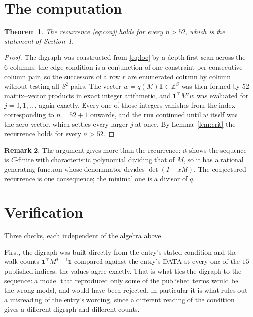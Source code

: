 \documentclass[11pt,a4paper]{article}
\theoremstyle{plain}
\newtheorem{theorem}{Theorem}
\theoremstyle{definition}
\newtheorem{remark}[theorem]{Remark}
\begin{document}
\section{The computation}

\begin{theorem}
The recurrence \eqref{eq:conj} holds for every $n>52$, which is the statement of
Section~1.
\end{theorem}

\begin{proof}
The digraph was constructed from \eqref{eq:loc} by a depth-first scan across the $6$
columns: the edge condition is a conjunction of one constraint per consecutive column
pair, so the successors of a row $r$ are enumerated column by column without testing all
$S^2$ pairs. The vector $w=q(M)\mathbf{1}\in\mathbb{Z}^{S}$ was then formed by $52$
matrix--vector products in exact integer arithmetic, and $\mathbf{1}^{\!\top}M^{j}w$ was
evaluated for $j=0,1,\dots$, again exactly. Every one of those integers vanishes from the
index corresponding to $n=52+1$ onwards, and the run continued until $w$ itself was the
zero vector, which settles every larger $j$ at once. By Lemma~\ref{lem:crit} the recurrence
holds for every $n>52$.
\end{proof}

\begin{remark}
The argument gives more than the recurrence: it shows the sequence is $C$-finite with
characteristic polynomial dividing that of $M$, so it has a rational generating function
whose denominator divides $\det(I-xM)$. The conjectured recurrence is one consequence; the
minimal one is a divisor of $q$.
\end{remark}

\section{Verification}

Three checks, each independent of the algebra above.

First, the digraph was built directly from the entry's stated condition and the walk counts
$\mathbf{1}^{\!\top}M^{L-1}\mathbf{1}$ compared against the entry's DATA at
every one of the $15$ published indices; the values agree exactly. That is what ties
the digraph to the sequence: a model that reproduced only some of the published terms would
be the wrong model, and would have been rejected. In particular it is what rules out a
misreading of the entry's wording, since a different reading of the condition gives a
different digraph and different counts.
\end{document}
